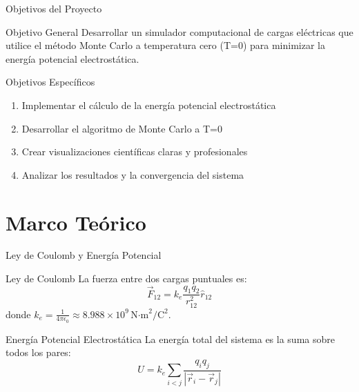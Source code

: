 \documentclass[10pt, aspectratio=169]{beamer}
\begin{document}
\begin{frame}{Objetivos del Proyecto}
  \begin{exampleblock}{Objetivo General}
    Desarrollar un simulador computacional de cargas eléctricas que utilice el método Monte Carlo a temperatura cero (T=0) para minimizar la energía potencial electrostática.
  \end{exampleblock}

  \pause

  \begin{block}{Objetivos Específicos}
    \begin{enumerate}
      \item Implementar el cálculo de la energía potencial electrostática
      \item Desarrollar el algoritmo de Monte Carlo a T=0
      \item Crear visualizaciones científicas claras y profesionales
      \item Analizar los resultados y la convergencia del sistema
    \end{enumerate}
  \end{block}
\end{frame}


\section{Marco Teórico}

\begin{frame}{Ley de Coulomb y Energía Potencial}
  \begin{block}{Ley de Coulomb \cite{carga-molina2024}}
    La fuerza entre dos cargas puntuales es:
    \[
    \vec{F}_{12} = k_e \frac{q_1 q_2}{r_{12}^2} \hat{r}_{12}
    \]
    donde \( k_e = \frac{1}{4\pi\epsilon_0} \approx 8.988 \times 10^9 \, \text{N·m}^2/\text{C}^2 \).
  \end{block}

  \pause

  \begin{block}{Energía Potencial Electrostática}
    La energía total del sistema es la suma sobre todos los pares:
    \[
    U = k_e \sum_{i < j} \frac{q_i q_j}{|\vec{r}_i - \vec{r}_j|}
    \]
  \end{block}
\end{frame}
\end{document}
